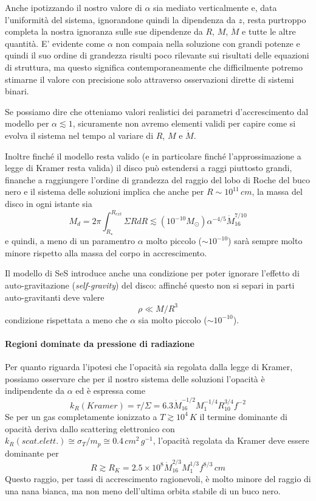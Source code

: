 \documentclass[a4paperbi]{article}
\begin{document}
	Anche ipotizzando il nostro valore di $\alpha$ sia mediato verticalmente e, data l'uniformità del sistema, ignorandone quindi la dipendenza da $z$, resta purtroppo completa la nostra ignoranza sulle sue dipendenze da $R$, $M$, $\dot{M}$ e tutte le altre quantità.
	E' evidente come $\alpha$ non compaia nella soluzione con grandi potenze e quindi il suo ordine di grandezza risulti poco rilevante sui risultati delle equazioni di struttura, ma questo significa contemporaneamente che difficilmente potremo stimarne il valore con precisione solo attraverso osservazioni dirette di sistemi binari. 
	
	Se possiamo dire che otteniamo valori realistici dei parametri d'accrescimento dal modello per $\alpha\lesssim1$, sicuramente non avremo elementi validi per capire come si evolva il sistema nel tempo al variare di $R$, $M$ e $\dot{M}$.
	
	Inoltre finché il modello resta valido (e in particolare finché l'approssimazione a legge di Kramer resta valida) il disco può estendersi a raggi piuttosto grandi, finanche a raggiungere l'ordine di grandezza del raggio del lobo di Roche del buco nero e il sistema delle soluzioni implica che anche per $R\sim10^{11}\,cm$, la massa del disco in ogni istante sia
	\begin{equation}
		M_d=2\pi\int^{R_{ext}}_{R_\star}\Sigma RdR\lesssim (10^{-10}M_\odot)\alpha^{-4/5}\dot{M}^{7/10}_16
	\end{equation}
	e quindi, a meno di un paramentro $\alpha$ molto piccolo ($\sim10^{-10}$) sarà sempre molto minore rispetto alla massa del corpo in accrescimento.
	
	Il modello di SeS introduce anche una condizione per poter ignorare l'effetto di auto-gravitazione (\textit{self-gravity}) del disco: affinché questo non si separi in parti auto-gravitanti deve valere
		\begin{equation}
			\rho\ll M/R^3
		\end{equation}
	condizione rispettata a meno che $\alpha$ sia molto piccolo ($\sim10^{-10}$).
	
	\paragraph{Regioni dominate da pressione di radiazione}
	Per quanto riguarda l'ipotesi che l'opacità sia regolata dalla legge di Kramer, possiamo osservare che per il nostro sistema delle soluzioni l'opacità è indipendente da $\alpha$ ed è espressa come
	\begin{equation}
		k_R(Kramer)=\tau/\Sigma=6.3\dot{M}^{-1/2}_{16}M^{-1/4}_1R^{3/4}_{10}f^{-2}
	\end{equation}
	Se per un gas completamente ionizzato a $T\gtrsim10^4\,K$ il termine dominante di opacità deriva dallo scattering elettronico con $k_R(scat. elett.)\cong\sigma_T/m_p\cong0.4\,cm^2\,g^{-1}$, l'opacità regolata da Kramer deve essere dominante per	
	\begin{equation}
		R\gtrsim R_K=2.5\times10^8\dot{M}^{2/3}_{16}M^{1/3}_1f^{8/3}\,cm
	\end{equation}
	Questo raggio, per tassi di accrescimento ragionevoli, è molto minore del raggio di una nana bianca, ma non meno dell'ultima orbita stabile di un buco nero.
	
\end{document}
